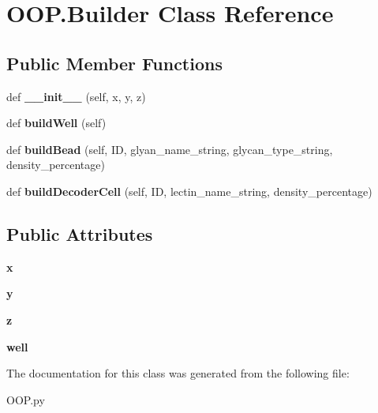 \hypertarget{class_o_o_p_1_1_builder}{}\section{O\+O\+P.\+Builder Class Reference}
\label{class_o_o_p_1_1_builder}
\subsection*{Public Member Functions}
\begin{DoxyCompactItemize}
\item 
\mbox{\label{class_o_o_p_1_1_builder_a411b856c6a67394b5b5bb22a1d842084}} 
def {\bfseries \+\_\+\+\_\+init\+\_\+\+\_\+} (self, x, y, z)
\item 
\mbox{\label{class_o_o_p_1_1_builder_a0eea0de9ec4e52ee06655026a639ccda}} 
def {\bfseries build\+Well} (self)
\item 
\mbox{\label{class_o_o_p_1_1_builder_a3d3b6a5868e3ff78e55f2f56643a093c}} 
def {\bfseries build\+Bead} (self, ID, glyan\+\_\+name\+\_\+string, glycan\+\_\+type\+\_\+string, density\+\_\+percentage)
\item 
\mbox{\label{class_o_o_p_1_1_builder_aee394a36797057d3062e8cc00ae0bf62}} 
def {\bfseries build\+Decoder\+Cell} (self, ID, lectin\+\_\+name\+\_\+string, density\+\_\+percentage)
\end{DoxyCompactItemize}
\subsection*{Public Attributes}
\begin{DoxyCompactItemize}
\item 
\mbox{\label{class_o_o_p_1_1_builder_a1b32d7d61a14024383c1653ce6395929}} 
{\bfseries x}
\item 
\mbox{\label{class_o_o_p_1_1_builder_af0f4e96f7f484650e51fdb8c85245686}} 
{\bfseries y}
\item 
\mbox{\label{class_o_o_p_1_1_builder_aaa4ad6ace7fd3ca021dc3aec3e13244f}} 
{\bfseries z}
\item 
\mbox{\label{class_o_o_p_1_1_builder_ad64e4b7688e8ff3fcc91bf6b097fe819}} 
{\bfseries well}
\end{DoxyCompactItemize}


The documentation for this class was generated from the following file\+:\begin{DoxyCompactItemize}
\item 
O\+O\+P.\+py\end{DoxyCompactItemize}
